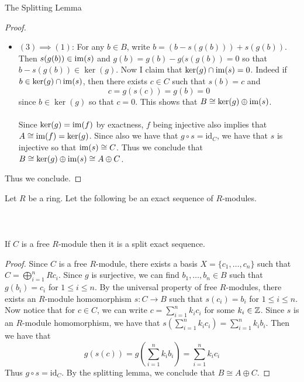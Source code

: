 \documentclass[a4paper]{article}
\begin{document}
\begin{prp}{The Splitting Lemma}{}
\begin{proof}
\begin{itemize}
\item $(3)\implies(1)$: For any $b\in B$, write $b=(b-s(g(b)))+s(g(b))$. Then $s(g(b))\in\operatorname{im}(s)$ and $g(b)=g(b)-g(s(g(b))=0$ so that $b-s(g(b))\in\ker(g)$. Now I claim that $\ker(g)\cap\operatorname{im}(s)=0$. Indeed if $b\in\ker(g)\cap\operatorname{im}(s)$, then there exists $c\in C$ such that $s(b)=c$ and $$c=g(s(c))=g(b)=0$$ since $b\in\ker(g)$ so that $c=0$. This shows that $B\cong\ker(g)\oplus\operatorname{im}(s)$. \\~\\

Since $\ker(g)=\operatorname{im}(f)$ by exactness, $f$ being injective also implies that $A\cong\operatorname{im}(f)=\ker(g)$. Since also we have that $g\circ s=\text{id}_C$, we have that $s$ is injective so that $\operatorname{im}(s)\cong C$. Thus we conclude that $B\cong\ker(g)\oplus\operatorname{im}(s)\cong A\oplus C$. 
\end{itemize}
Thus we conclude. 
\end{proof}
\end{prp}

\begin{prp}{}{} Let $R$ be a ring. Let the following be an exact sequence of $R$-modules. \\~\\
\\~\\
If $C$ is a free $R$-module then it is a split exact sequence. \tcbline
\begin{proof}
Since $C$ is a free $R$-module, there exists a basis $X=\{c_1,\dots,c_n\}$ such that $C=\bigoplus_{i=1}^nRc_i$. Since $g$ is surjective, we can find $b_1,\dots,b_n\in B$ such that $g(b_i)=c_i$ for $1\leq i\leq n$. By the universal property of free $R$-modules, there exists an $R$-module homomorphism $s:C\to B$ such that $s(c_i)=b_i$ for $1\leq i\leq n$. Now notice that for $c\in C$, we can write $c=\sum_{i=1}^nk_ic_i$ for some $k_i\in\mathbb{Z}$. Since $s$ is an $R$-module homomorphism, we have that $s\left(\sum_{i=1}^nk_ic_i\right)=\sum_{i=1}^nk_ib_i$. Then we have that $$g(s(c))=g\left(\sum_{i=1}^nk_ib_i\right)=\sum_{i=1}^nk_ic_i$$ Thus $g\circ s=\text{id}_C$. By the splitting lemma, we conclude that $B\cong A\oplus C$. 
\end{proof}
\end{prp}
\end{document}

